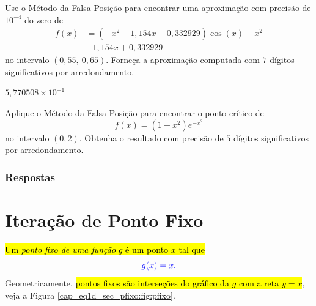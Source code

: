 \begin{exer}
  Use o Método da Falsa Posição para encontrar uma aproximação com precisão de $10^{-4}$ do zero de
  \begin{equation}
    \begin{aligned}
      f(x) &= (-x^2+1,154x-0,332929)\cos(x) + x^2 \\
           &- 1,154x + 0,332929
    \end{aligned}
\end{equation}
no intervalo $(0,55, ~0,65)$. Forneça a aproximação computada com $7$ dígitos significativos por arredondamento.
\end{exer}
\begin{resp}
  $5,770508\times 10^{-1}$
\end{resp}

\begin{exer}
  Aplique o Método da Falsa Posição para encontrar o ponto crítico de
  \begin{equation}
    f(x) = (1-x^2)e^{-x^2}
  \end{equation}
  no intervalo $(0, 2)$. Obtenha o resultado com precisão de $5$ dígitos significativos por arredondamento.
\end{exer}

\ifisbook
\subsubsection{Respostas}
\shipoutAnswer
\fi


\section{Iteração de Ponto Fixo}\label{cap_eq1d_sec_pfixo}

\hl{Um \emph{ponto fixo de uma função} $g$ é um ponto $x$ tal que}
\begin{equation}\color{blue}g(x) = x.
\end{equation}
Geometricamente, \hl{pontos fixos são interseções do gráfico da $g$ com a reta $y=x$}, veja a Figura \ref{cap_eq1d_sec_pfixo:fig:pfixo}.


